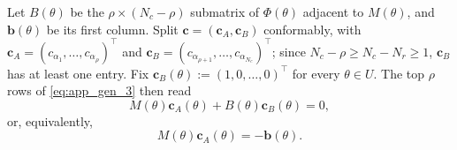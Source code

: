 \documentclass[11pt,twoside]{article} %
\begin{document}

Let $B(\theta)$ be the $\rho\times(N_c-\rho)$   submatrix of $\Phi(\theta)$ adjacent to $M(\theta)$, and $\mathbf{b}(\theta)$ be its first column.
Split
$\mathbf c=(\mathbf c_A,\mathbf c_B)$ conformably, with
$\mathbf c_A=(c_{\alpha_1},\dots,c_{\alpha_{\rho}})^\top$ and
$\mathbf c_B=(c_{\alpha_{\rho+1}},\dots,c_{\alpha_{N_c}})^\top$; since $N_c-\rho\ge N_c-N_r\ge1$, 
$\mathbf c_B$ has at least one entry. 
Fix $\mathbf c_B(\theta):=(1,0,\dots,0)^\top$ for every $\theta\in U$. The top $\rho$ rows of \eqref{eq:app_gen_3}
then read
\[
 M(\theta)\mathbf c_A(\theta)+B(\theta)\mathbf c_B(\theta)=0,
\]
or, equivalently, 
\[
 M(\theta)\mathbf c_A(\theta)=-\mathbf b(\theta).
\]
\end{document}
